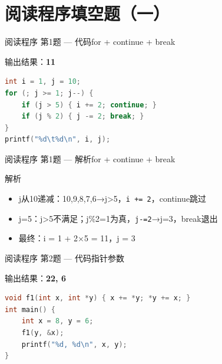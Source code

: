 \section{阅读程序填空题（一）}

\begin{frame}[fragile]{阅读程序 第1题 --- 代码}{for + continue + break}
    \begin{exampleblock}{输出结果：\textbf{11}}
    \end{exampleblock}
    \begin{lstlisting}[language=C]
int i = 1, j = 10;
for (; j >= 1; j--) {
    if (j > 5) { i += 2; continue; }
    if (j % 2) { j -= 2; break; }
}
printf("%d\t%d\n", i, j);
\end{lstlisting}
\end{frame}

\begin{frame}{阅读程序 第1题 --- 解析}{for + continue + break}
    \begin{alertblock}{解析}
        \footnotesize
        \begin{itemize}
            \setlength{\itemsep}{0pt}
            \item j从10递减：10,9,8,7,6→j>5，\texttt{i += 2}，continue跳过
            \item j=5：j>5不满足；j\%2=1为真，\texttt{j-=2}→j=3，break退出
            \item 最终：i = 1 + 2×5 = 11，j = 3
        \end{itemize}
    \end{alertblock}
\end{frame}

\begin{frame}[fragile]{阅读程序 第2题 --- 代码}{指针参数}
    \begin{exampleblock}{输出结果：\textbf{22, 6}}
    \end{exampleblock}
    \begin{lstlisting}[language=C,basicstyle=\scriptsize\ttfamily]
void f1(int x, int *y) { x += *y; *y += x; }
int main() {
    int x = 8, y = 6;
    f1(y, &x);
    printf("%d, %d\n", x, y);
}
\end{lstlisting}
\end{frame}

